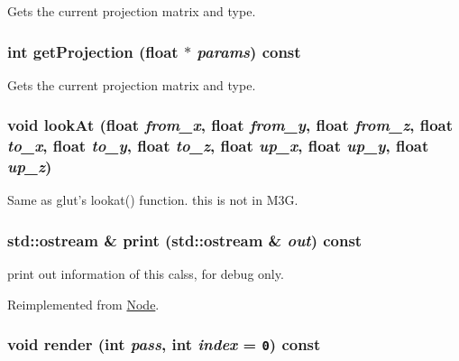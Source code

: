 Gets the current projection matrix and type. \hypertarget{classm3g_1_1Camera_a2ebe46a4e16fee86d4f547588411302}{
\subsubsection[{getProjection}]{\setlength{\rightskip}{0pt plus 5cm}int getProjection (float $\ast$ {\em params}) const}}
\label{classm3g_1_1Camera_a2ebe46a4e16fee86d4f547588411302}


Gets the current projection matrix and type. \hypertarget{classm3g_1_1Camera_0006b18ae0e27a031d533e987b9756a8}{
\subsubsection[{lookAt}]{\setlength{\rightskip}{0pt plus 5cm}void lookAt (float {\em from\_\-x}, \/  float {\em from\_\-y}, \/  float {\em from\_\-z}, \/  float {\em to\_\-x}, \/  float {\em to\_\-y}, \/  float {\em to\_\-z}, \/  float {\em up\_\-x}, \/  float {\em up\_\-y}, \/  float {\em up\_\-z})}}
\label{classm3g_1_1Camera_0006b18ae0e27a031d533e987b9756a8}


Same as glut's lookat() function. this is not in M3G. \hypertarget{classm3g_1_1Camera_6fea17fa1532df3794f8cb39cb4f911f}{
\subsubsection[{print}]{\setlength{\rightskip}{0pt plus 5cm}std::ostream \& print (std::ostream \& {\em out}) const}}
\label{classm3g_1_1Camera_6fea17fa1532df3794f8cb39cb4f911f}


print out information of this calss, for debug only. 

Reimplemented from \hyperlink{classm3g_1_1Node_6fea17fa1532df3794f8cb39cb4f911f}{Node}.\hypertarget{classm3g_1_1Camera_1efcb1973989d9963d5bd6d03065d389}{
\subsubsection[{render}]{\setlength{\rightskip}{0pt plus 5cm}void render (int {\em pass}, \/  int {\em index} = {\tt 0}) const}}
\label{classm3g_1_1Camera_1efcb1973989d9963d5bd6d03065d389}


